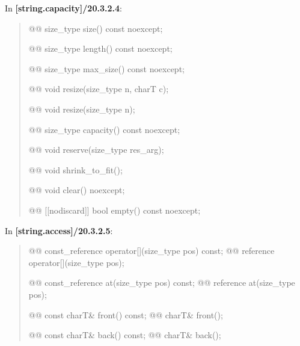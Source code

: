 \documentclass{wg21}
\begin{document}
In \textbf{[string.capacity]/20.3.2.4}:
\begin{quote}
\begin{itemdecl}
@@ size_type size() const noexcept;
\end{itemdecl}

\begin{itemdecl}
@@ size_type length() const noexcept;
\end{itemdecl}

\begin{itemdecl}
@@ size_type max_size() const noexcept;
\end{itemdecl}

\begin{itemdecl}
@@ void resize(size_type n, charT c);
\end{itemdecl}

\begin{itemdecl}
@@ void resize(size_type n);
\end{itemdecl}

\begin{itemdecl}
@@ size_type capacity() const noexcept;
\end{itemdecl}

\begin{itemdecl}
@@ void reserve(size_type res_arg);
\end{itemdecl}

\begin{itemdecl}
@@ void shrink_to_fit();
\end{itemdecl}

\begin{itemdecl}
@@ void clear() noexcept;
\end{itemdecl}

\begin{itemdecl}
@@ [[nodiscard]] bool empty() const noexcept;
\end{itemdecl}
\end{quote}


In \textbf{[string.access]/20.3.2.5}:
\begin{quote}
\begin{itemdecl}
@@ const_reference operator[](size_type pos) const;
@@ reference       operator[](size_type pos);
\end{itemdecl}

\begin{itemdecl}
@@ const_reference at(size_type pos) const;
@@ reference       at(size_type pos);
\end{itemdecl}

\begin{itemdecl}
@@ const charT& front() const;
@@ charT& front();
\end{itemdecl}

\begin{itemdecl}
@@ const charT& back() const;
@@ charT& back();
\end{itemdecl}
\end{quote}
\end{document}
